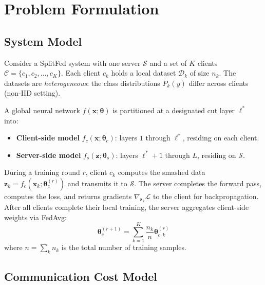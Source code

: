 \documentclass[12pt,a4paper]{report}
\begin{document}
\chapter{Problem Formulation}
\label{ch:problem}

\section{System Model}

Consider a SplitFed system with one server $\mathcal{S}$ and a set of $K$ clients $\mathcal{C} = \{c_1, c_2, \ldots, c_K\}$. Each client $c_k$ holds a local dataset $\mathcal{D}_k$ of size $n_k$. The datasets are \emph{heterogeneous}: the class distributions $P_k(y)$ differ across clients (non-IID setting).

A global neural network $f(\mathbf{x}; \boldsymbol{\theta})$ is partitioned at a designated cut layer $\ell^*$ into:
\begin{itemize}
  \item \textbf{Client-side model} $f_c(\mathbf{x}; \boldsymbol{\theta}_c)$: layers $1$ through $\ell^*$, residing on each client.
  \item \textbf{Server-side model} $f_s(\mathbf{z}; \boldsymbol{\theta}_s)$: layers $\ell^*+1$ through $L$, residing on $\mathcal{S}$.
\end{itemize}

During a training round $r$, client $c_k$ computes the smashed data $\mathbf{z}_k = f_c(\mathbf{x}_k; \boldsymbol{\theta}_c^{(r)})$ and transmits it to $\mathcal{S}$. The server completes the forward pass, computes the loss, and returns gradients $\nabla_{\mathbf{z}_k} \mathcal{L}$ to the client for backpropagation. After all clients complete their local training, the server aggregates client-side weights via FedAvg:
\begin{equation}
  \boldsymbol{\theta}_c^{(r+1)} = \sum_{k=1}^{K} \frac{n_k}{n} \boldsymbol{\theta}_{c,k}^{(r)}
  \label{eq:fedavg}
\end{equation}
where $n = \sum_k n_k$ is the total number of training samples.

\section{Communication Cost Model}
\end{document}
